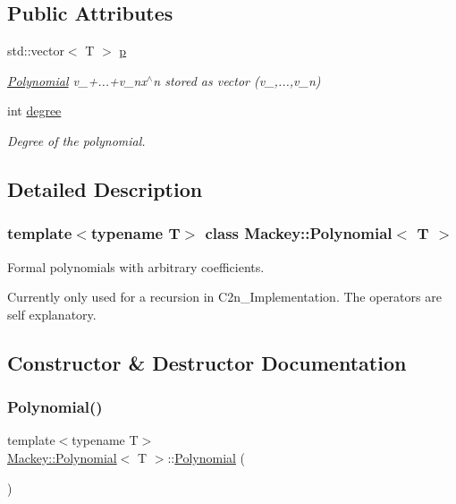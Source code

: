 \subsection*{Public Attributes}
\begin{DoxyCompactItemize}
\item 
std\+::vector$<$ T $>$ \hyperlink{classMackey_1_1Polynomial_ac2784853ce2afbcc21860a9e54e15711}{p}
\begin{DoxyCompactList}\small\item\em \hyperlink{classMackey_1_1Polynomial}{Polynomial} v\+\_+...+v\+\_\+nx$^\wedge$n stored as vector (v\+\_,...,v\+\_\+n) \end{DoxyCompactList}\item 
int \hyperlink{classMackey_1_1Polynomial_a3f55b12a6eee67da2f55e87b97f06349}{degree}
\begin{DoxyCompactList}\small\item\em Degree of the polynomial. \end{DoxyCompactList}\end{DoxyCompactItemize}


\subsection{Detailed Description}
\subsubsection*{template$<$typename T$>$\newline
class Mackey\+::\+Polynomial$<$ T $>$}

Formal polynomials with arbitrary coefficients. 

Currently only used for a recursion in C2n\+\_\+\+Implementation. The operators are self explanatory. 

\subsection{Constructor \& Destructor Documentation}
\mbox{\label{classMackey_1_1Polynomial_a0e0bda8d8d0d5ade1cbb0b0cc79b8d56}} 
\subsubsection{\texorpdfstring{Polynomial()}{Polynomial()}\hspace{0.1cm}{\footnotesize\ttfamily [1/4]}}
{\footnotesize\ttfamily template$<$typename T$>$ \\
\hyperlink{classMackey_1_1Polynomial}{Mackey\+::\+Polynomial}$<$ T $>$\+::\hyperlink{classMackey_1_1Polynomial}{Polynomial} (\begin{DoxyParamCaption}{ }\end{DoxyParamCaption})\hspace{0.3cm}{\ttfamily [inline]}}



